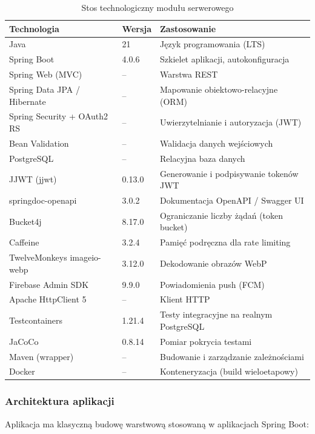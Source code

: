 \documentclass[12pt,a4paper]{article}
\begin{document}
\begin{table}[htbp]
\centering
\caption{Stos technologiczny modu\l{}u serwerowego}
\label{tab:stos_api}
\vspace{0.3em}
\begin{tabularx}{\textwidth}{@{}lll@{}}
\toprule
\textbf{Technologia} & \textbf{Wersja} & \textbf{Zastosowanie} \\
\midrule
Java & 21 & J\k{e}zyk programowania (LTS) \\
Spring Boot & 4.0.6 & Szkielet aplikacji, autokonfiguracja \\
Spring Web (MVC) & -- & Warstwa REST \\
Spring Data JPA / Hibernate & -- & Mapowanie obiektowo-relacyjne (ORM) \\
Spring Security + OAuth2 RS & -- & Uwierzytelnianie i autoryzacja (JWT) \\
Bean Validation & -- & Walidacja danych wej\'sciowych \\
PostgreSQL & -- & Relacyjna baza danych \\
JJWT (jjwt) & 0.13.0 & Generowanie i podpisywanie token\'ow JWT \\
springdoc-openapi & 3.0.2 & Dokumentacja OpenAPI / Swagger UI \\
Bucket4j & 8.17.0 & Ograniczanie liczby \.z\k{a}da\'n (token bucket) \\
Caffeine & 3.2.4 & Pami\k{e}\'c podr\k{e}czna dla rate limiting \\
TwelveMonkeys imageio-webp & 3.12.0 & Dekodowanie obraz\'ow WebP \\
Firebase Admin SDK & 9.9.0 & Powiadomienia push (FCM) \\
Apache HttpClient 5 & -- & Klient HTTP \\
Testcontainers & 1.21.4 & Testy integracyjne na realnym PostgreSQL \\
JaCoCo & 0.8.14 & Pomiar pokrycia testami \\
Maven (wrapper) & -- & Budowanie i zarz\k{a}dzanie zale\.zno\'sciami \\
Docker & -- & Konteneryzacja (build wieloetapowy) \\
\bottomrule
\end{tabularx}
\end{table}

\subsubsection{Architektura aplikacji}

Aplikacja ma klasyczn\k{a} budow\k{e} warstwow\k{a} stosowan\k{a} w aplikacjach Spring Boot:
\end{document}
